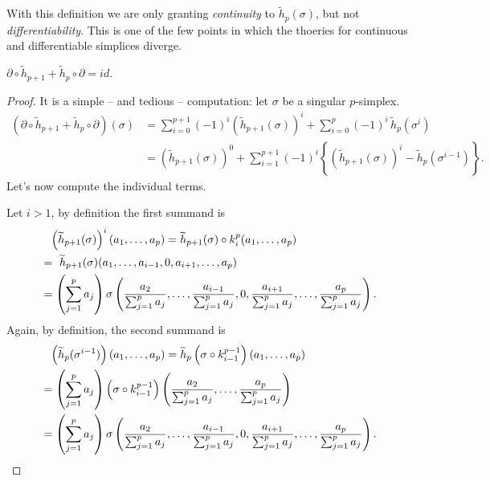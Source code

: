 \begin{rem}
	With this definition we are only granting \textit{continuity} to $\widetilde{h}_p(\sigma)$, but not \textit{differentiability}.
	This is one of the few points in which the thoeries for continuous and differentiable simplices diverge.
\end{rem}

\begin{lem}\label{lem:boundary_hom}
	$\partial \circ \widetilde{h}_{p+1} + \widetilde{h}_p \circ \partial = id$.
\end{lem} 
\begin{proof}
	It is a simple -- and tedious -- computation:
	let $\sigma$ be a singular $p$-simplex.
	\begin{align}
		\left(\partial \circ \widetilde{h}_{p+1} + \widetilde{h}_p \circ \partial\right)(\sigma) &= \sum_{i=0}^{p+1} (-1)^i  \left( \widetilde{h}_{p+1}(\sigma) \right)^i + \sum_{i=0}^{p} (-1)^i\, \widetilde{h}_p (\sigma^i)\\
													 &= \left( \widetilde{h}_{p+1}(\sigma) \right)^0 + \sum_{i=1}^{p+1} (-1)^i \left\{ \left( \widetilde{h}_{p+1}(\sigma) \right)^i - \widetilde{h}_p(\sigma^{i-1}) \right\}\label{eqn:defn_boundary_hom}
	.\end{align} 
	Let's now compute the individual terms.

	Let $i > 1$, by definition the first summand is
	\begin{align}
		&\hphantom{=} \left( \widetilde{h}_{p+1}(\sigma) \right)^i (a_1, \ldots, a_p) = \widetilde{h}_{p+1}(\sigma) \circ k_i^p (a_1, \ldots, a_p)\\ 
		&=\ \widetilde{h}_{p+1}(\sigma)(a_1, \ldots, a_{i-1}, 0, a_{i+1}, \ldots, a_p)\\
		&= \left( \sum_{j=1}^{p} a_j \right) \sigma\left(\frac{a_2}{\sum_{j=1}^{p} a_j}, \ldots, \frac{a_{i-1}}{\sum_{j=1}^{p} a_j}, 0, \frac{a_{i+1}}{\sum_{j=1}^{p} a_j}, \ldots, \frac{a_p}{\sum_{j=1}^{p} a_j} \right)
	.\end{align} 
	Again, by definition, the second summand is
	\begin{align}
		&\hphantom{=} \left( \widetilde{h}_{p}(\sigma^{i-1}) \right) (a_1, \ldots, a_p) = \widetilde{h}_{p}\left(\sigma \circ k_{i-1}^{p-1}\right) (a_1, \ldots, a_p)\\
		&= \left( \sum_{j=1}^{p} a_j \right) \left(\sigma \circ k_{i-1}^{p-1}\right) \left(\frac{a_2}{\sum_{j=1}^{p} a_j}, \ldots, \frac{a_p}{\sum_{j=1}^{p} a_j} \right)\\
		&= \left( \sum_{j=1}^{p} a_j \right) \sigma\left(\frac{a_2}{\sum_{j=1}^{p} a_j}, \ldots, \frac{a_{i-1}}{\sum_{j=1}^{p} a_j}, 0, \frac{a_{i+1}}{\sum_{j=1}^{p} a_j}, \ldots, \frac{a_p}{\sum_{j=1}^{p} a_j} \right)
	.\end{align} 


\end{proof}

